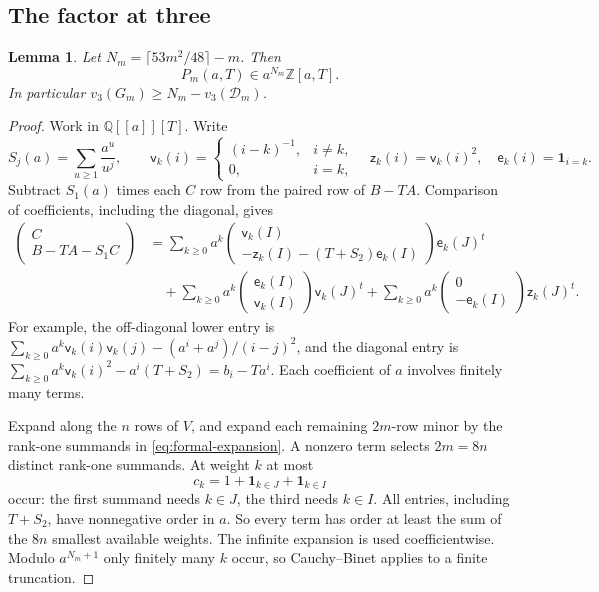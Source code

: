 \documentclass{amsart}
\newtheorem{lemma}{Lemma}[section]
\numberwithin{equation}{section}
\numberwithin{table}{section}
\newcommand{\Z}{\mathbb{Z}}
\begin{document}
\subsection{The factor at three}
\begin{lemma}\label{lem:formal-divisor}
Let $N_m=\lceil53m^2/48\rceil-m$. Then
\begin{equation}\label{eq:formal-divisor}
 P_m(a,T)\in a^{N_m}\Z[a,T].
\end{equation}
In particular $v_3(G_m)\ge N_m-v_3(\mathcal D_m)$.
\end{lemma}
\begin{proof}
Work in $\mathbb Q[[a]][T]$. Write
\[
 S_j(a)=\sum_{u\ge1}\frac{a^u}{u^j},\qquad
 \mathsf v_k(i)=\begin{cases}(i-k)^{-1},&i\ne k,\\0,&i=k,\end{cases}
 \quad \mathsf z_k(i)=\mathsf v_k(i)^2,\quad \mathsf e_k(i)=\mathbf1_{i=k}.
\]
Subtract $S_1(a)$ times each $C$ row from the paired row of $B-TA$.
Comparison of coefficients, including the diagonal, gives
\begin{equation}\label{eq:formal-expansion}
\begin{aligned}
\begin{pmatrix}C\\B-TA-S_1C\end{pmatrix}
&=\sum_{k\ge0}a^k
 \begin{pmatrix}\mathsf v_k(I)\\-\mathsf z_k(I)-(T+S_2)\mathsf e_k(I)\end{pmatrix}\mathsf e_k(J)^t\\
&\quad+\sum_{k\ge0}a^k\begin{pmatrix}\mathsf e_k(I)\\\mathsf v_k(I)\end{pmatrix}\mathsf v_k(J)^t
 +\sum_{k\ge0}a^k\begin{pmatrix}0\\-\mathsf e_k(I)\end{pmatrix}\mathsf z_k(J)^t.
\end{aligned}
\end{equation}
For example, the off-diagonal lower entry is
$\sum_{k\ge0}a^k\mathsf v_k(i)\mathsf v_k(j)-(a^i+a^j)/(i-j)^2$, and the diagonal entry is
$\sum_{k\ge0}a^k\mathsf v_k(i)^2-a^i(T+S_2)=b_i-Ta^i$. Each coefficient of $a$
involves finitely many terms.

Expand along the $n$ rows of $V$, and expand each remaining $2m$-row minor
by the rank-one summands in \eqref{eq:formal-expansion}. A nonzero term
selects $2m=8n$ distinct rank-one summands. At weight $k$ at most
\begin{equation*}
 c_k=1+\mathbf1_{k\in J}+\mathbf1_{k\in I}
\end{equation*}
occur: the first summand needs $k\in J$, the third needs $k\in I$. All
entries, including $T+S_2$, have nonnegative order in $a$. So every term
has order at least the sum of the $8n$ smallest available weights.
The infinite expansion is used coefficientwise. Modulo
$a^{N_m+1}$ only finitely many $k$ occur, so Cauchy--Binet applies to a
finite truncation.


\end{proof}
\end{document}
